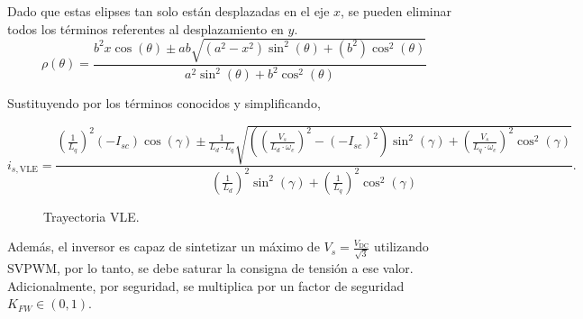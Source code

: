 Dado que estas elipses tan solo están desplazadas en el eje $x$, se pueden eliminar todos los términos referentes al desplazamiento en $y$.
\begin{equation}
\rho(\theta) = \frac{b^2 x \cos (\theta ) \pm a b \sqrt{\left(a^2-x^2\right) \sin ^2(\theta )+\left(b^2\right) \cos ^2(\theta )}}{a^2 \sin ^2(\theta )+b^2 \cos ^2(\theta )}
\end{equation}

Sustituyendo por los términos conocidos y simplificando,

\begin{equation}
	i_{s,\text{VLE}} =\frac{\left(\frac{1}{L_q}\right)^2\left(-I_{s c}\right) \cos (\gamma) \pm \frac{1}{L_d \cdot L_q} \sqrt{\left(\left(\frac{V_s}{L_d \cdot \omega_e}\right)^2-\left(-I_{s c}\right)^2\right) \sin ^2(\gamma)+\left(\frac{V_s}{L_q \cdot \omega_e}\right)^2 \cos ^2(\gamma)}}{\left(\frac{1}{L_d}\right)^2 \sin ^2(\gamma)+\left(\frac{1}{L_q}\right)^2 \cos ^2(\gamma)} \text{.}
\end{equation}


\begin{figure}[H]
  \centering
  \caption{Trayectoria VLE.}
\end{figure}



Además, el inversor es capaz de sintetizar un máximo de $V_s = \frac{V_{\text{DC}}}{\sqrt{3}}$ utilizando SVPWM, por lo tanto, se debe saturar la consigna de tensión a ese valor. Adicionalmente, por seguridad, se multiplica por un factor de seguridad $K_{FW} \in (0,1)$.

